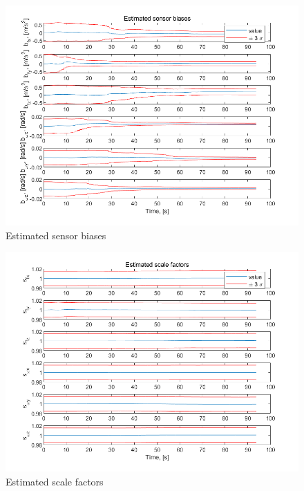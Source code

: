 \documentclass[conference]{IEEEtran}
\begin{document}
\begin{figure}[htbp]
    \centerline{\includegraphics[width=1.0\columnwidth]{fig25.png}}
    \caption{Estimated sensor biases}
\end{figure}

\begin{figure}[htbp]
    \centerline{\includegraphics[width=1.0\columnwidth]{fig26.png}}
    \caption{Estimated scale factors}
\end{figure}
\end{document}
